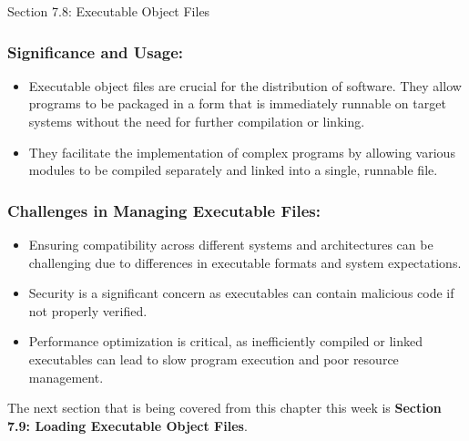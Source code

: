 \begin{notes}{Section 7.8: Executable Object Files}
    \subsubsection*{Significance and Usage:}
    
    \begin{itemize}
        \item Executable object files are crucial for the distribution of software. They allow programs to be packaged in a form that is immediately runnable on target systems without the need for 
        further compilation or linking.
        \item They facilitate the implementation of complex programs by allowing various modules to be compiled separately and linked into a single, runnable file.
    \end{itemize}
    
    \subsubsection*{Challenges in Managing Executable Files:}
    
    \begin{itemize}
        \item Ensuring compatibility across different systems and architectures can be challenging due to differences in executable formats and system expectations.
        \item Security is a significant concern as executables can contain malicious code if not properly verified.
        \item Performance optimization is critical, as inefficiently compiled or linked executables can lead to slow program execution and poor resource management.
    \end{itemize}    
\end{notes}

The next section that is being covered from this chapter this week is \textbf{Section 7.9: Loading Executable Object Files}.


